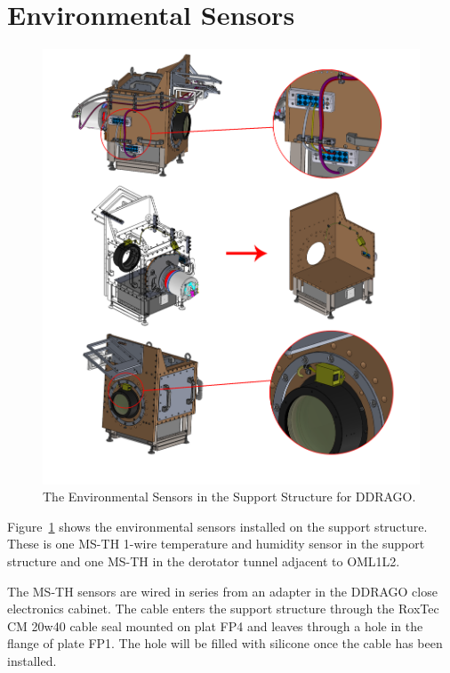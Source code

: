 \documentclass{article}
\begin{document}

\clearpage
\section{Environmental Sensors}

\begin{figure}
\begin{center}
\includegraphics[width=\linewidth]{newfigures/Fig8_1.png}
\end{center}
\caption{The Environmental Sensors in the Support Structure for DDRAGO.}
\label{figure:alex-environmental-sensors}
\end{figure}

Figure~\ref{figure:alex-environmental-sensors} shows the environmental sensors installed on the support structure. These is one MS-TH 1-wire temperature and humidity sensor in the support structure and one MS-TH in the derotator tunnel adjacent to OML1L2.

The MS-TH sensors are wired in series from an adapter in the DDRAGO close electronics cabinet. The cable enters the support structure through the RoxTec CM 20w40 cable seal mounted on plat FP4 and leaves through a hole in the flange of plate FP1. The hole will be filled with silicone once the cable has been installed.
\end{document}
